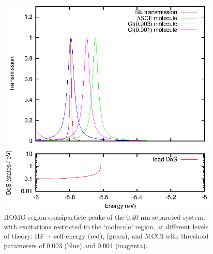 \begin{figure}
	\begin{center}
		\includegraphics[width=0.9\linewidth]{figures/figure6a_6b}
	\end{center}
	\caption{HOMO region quasiparticle peaks of the 0.40 nm separated
	         system, with excitations restricted to the `molecule' region,
		 at different levels of theory: HF + self-energy (red),
		 \dscf (green), and MCCI with threshold parameters of
		 0.003 (blue) and 0.001 (magenta).}
	\label{fig:all40Ahomo}
\end{figure}

